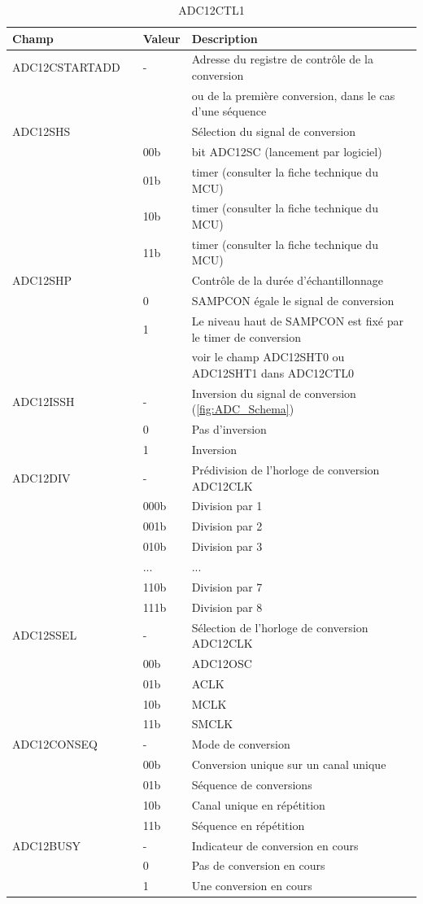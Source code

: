 \begin{table}[H]
\centering 
\begin{tabular}{l l l l}
\hline\hline
Champ & & Valeur & Description \\ %
\hline
ADC12CSTARTADD & & - & Adresse du registre de contrôle de la conversion \\
& & & ou de la première conversion, dans le cas d'une séquence \\
\hline
ADC12SHS & & & Sélection du signal de conversion \\
& & 00b & bit ADC12SC (lancement par logiciel) \\
& & 01b & timer (consulter la fiche technique du MCU) \\
& & 10b & timer (consulter la fiche technique du MCU) \\
& & 11b & timer (consulter la fiche technique du MCU) \\
\hline
ADC12SHP & & & Contrôle de la durée d'échantillonnage \\
& & 0 & SAMPCON égale le signal de conversion \\
& & 1 & Le niveau haut de SAMPCON est fixé par le timer de conversion \\
& & & voir le champ ADC12SHT0 ou ADC12SHT1 dans ADC12CTL0 \\
\hline
ADC12ISSH & & - & Inversion du signal de conversion (\ref{fig:ADC_Schema})\\
& & 0 & Pas d'inversion \\
& & 1 & Inversion \\
\hline
ADC12DIV & & - & Prédivision de l'horloge de conversion ADC12CLK \\
& & 000b & Division par 1 \\
& & 001b & Division par 2 \\
& & 010b & Division par 3 \\
& & ... & ... \\
& & 110b & Division par 7 \\
& & 111b & Division par 8 \\
\hline
ADC12SSEL & & - & Sélection de l'horloge de conversion ADC12CLK \\
& & 00b & ADC12OSC \\
& & 01b & ACLK \\
& & 10b & MCLK \\
& & 11b & SMCLK \\
\hline
ADC12CONSEQ & & - & Mode de conversion \\
& & 00b & Conversion unique sur un canal unique \\
& & 01b & Séquence de conversions \\
& & 10b & Canal unique en répétition \\
& & 11b & Séquence en répétition \\
\hline
ADC12BUSY & & - & Indicateur de conversion en cours\\
& & 0 & Pas de conversion en cours \\
& & 1 & Une conversion en cours \\
\hline
\end{tabular}
\caption{ADC12CTL1}
\label{table:ADC12CTL1}
\end{table}

